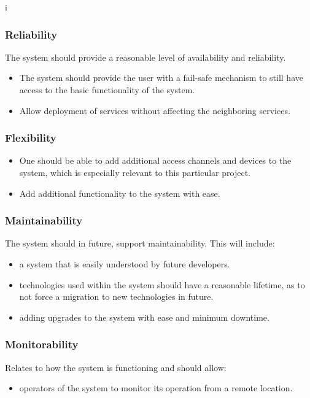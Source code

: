 i\documentclass[a4paper,12pt]{article}
\begin{document}
	\subsubsection{Reliability}
	The system should provide a reasonable level of availability and reliability.
	\begin{itemize}
		\item The system should provide the user with a fail-safe mechanism to still have access to the basic functionality of the system.
		\item Allow deployment of services without affecting the neighboring services. 
	\end{itemize}
	
	\subsubsection{Flexibility}
	\begin{itemize}
		\item One should be able to add additional access channels and devices to the system, which is especially relevant to this particular project.
		\item Add additional functionality to the system with ease.
	\end{itemize}
	
	\subsubsection{Maintainability}
	The system should in future, support maintainability. This will include:
	\begin{itemize}
		\item a system that is easily understood by future developers.
		\item technologies used within the system should have a reasonable lifetime, as to not force a migration to new technologies in future.
		\item adding upgrades to the system with ease and minimum downtime.
	\end{itemize}
	
	\subsubsection{Monitorability}
	Relates to how the system is functioning and should allow:
	\begin{itemize}
		\item operators of the system to monitor its operation from a remote location.  
	\end{itemize}
	
\end{document}

